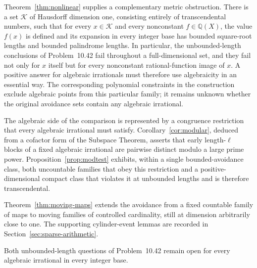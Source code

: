\documentclass[11pt,reqno,a4paper]{amsart}
\theoremstyle{remark}
\newcommand{\Q}{\mathbb Q}
\begin{document}
Theorem~\ref{thm:nonlinear} supplies a complementary metric obstruction. There is a set $\mathcal K$ of Hausdorff dimension one, consisting entirely of transcendental numbers, such that for every $x\in\mathcal K$ and every nonconstant $f\in\Q(X)$, the value $f(x)$ is defined and its expansion in every integer base has bounded square-root lengths and bounded palindrome lengths. In particular, the unbounded-length conclusions of Problem~10.42 fail throughout a full-dimensional set, and they fail not only for $x$ itself but for every nonconstant rational-function image of $x$. A positive answer for algebraic irrationals must therefore use algebraicity in an essential way. The corresponding polynomial constraints in the construction exclude algebraic points from this particular family; it remains unknown whether the original avoidance sets contain any algebraic irrational.

The algebraic side of the comparison is represented by a congruence restriction that every algebraic irrational must satisfy. Corollary~\ref{cor:modular}, deduced from a cofactor form of the Subspace Theorem, asserts that early length-$\ell$ blocks of a fixed algebraic irrational are pairwise distinct modulo a large prime power. Proposition~\ref{prop:modtest} exhibits, within a single bounded-avoidance class, both uncountable families that obey this restriction and a positive-dimensional compact class that violates it at unbounded lengths and is therefore transcendental.

Theorem~\ref{thm:moving-maps} extends the avoidance from a fixed countable family of maps to moving families of controlled cardinality, still at dimension arbitrarily close to one. The supporting cylinder-event lemmas are recorded in Section~\ref{sec:sparse-arithmetic}.

Both unbounded-length questions of Problem~10.42 remain open for every algebraic irrational in every integer base.





\end{document}
